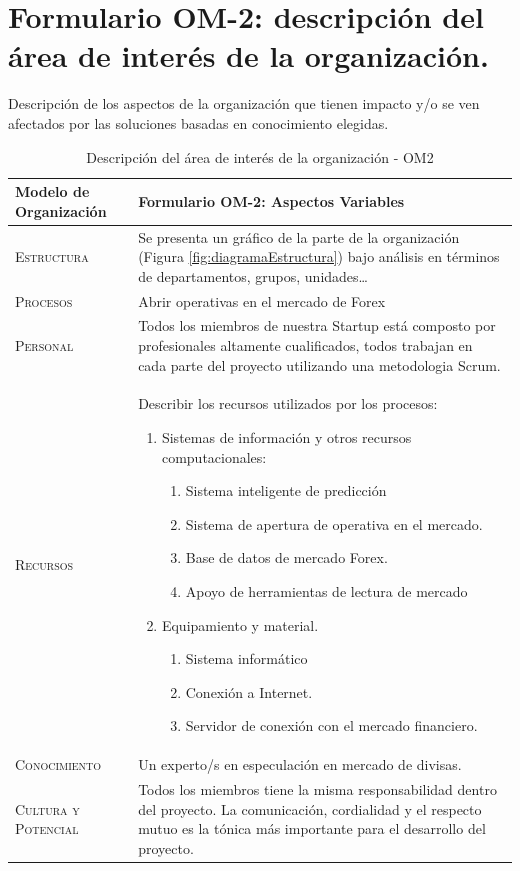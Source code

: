  
\section{Formulario OM-2: descripción del área de interés de la organización.}

Descripción de los aspectos de la organización que tienen impacto y/o se ven afectados
  por las soluciones basadas en conocimiento elegidas.


\begin{table}[H]
\scriptsize
\begin{tabularx}{\textwidth}{|l|X|} \hline
\textbf{Modelo de Organización} & \textbf{Formulario OM-2: Aspectos Variables} \\ \hline\hline

\textsc{Estructura} & Se presenta un gráfico de la parte de la organización (Figura \ref{fig:diagramaEstructura}) bajo análisis en términos de departamentos, grupos, unidades\dots\\ \hline

\textsc{Procesos} & Abrir operativas en el mercado de Forex\\ \hline
\textsc{Personal} &  Todos los miembros de nuestra Startup está composto por profesionales altamente cualificados, todos trabajan en cada parte del proyecto utilizando una metodologia Scrum.\\ \hline
\textsc{Recursos} &  Describir los recursos utilizados por los procesos:
\begin{enumerate}
    \item Sistemas de información y otros recursos computacionales:
    \begin{enumerate}
      \item Sistema inteligente de predicción
      \item Sistema de apertura de operativa en el mercado.
      \item Base de datos de mercado Forex.
      \item Apoyo de herramientas de lectura de mercado
    \end{enumerate}
    \item Equipamiento y material.
    \begin{enumerate}
      \item Sistema informático
      \item Conexión a Internet.
      \item Servidor de conexión con el mercado financiero.
    \end{enumerate}
\end{enumerate}
\\ \hline
\textsc{Conocimiento} &  Un experto/s en especulación en mercado de divisas.\\ \hline
\textsc{Cultura y Potencial} &  Todos los miembros tiene la misma responsabilidad dentro del proyecto. La comunicación, cordialidad y el respecto mutuo es la tónica más importante para el desarrollo del proyecto.\\ \hline
\end{tabularx}
  \caption{\label{tab:OM2}Descripción del área de interés de la organización - OM2}
\end{table}
